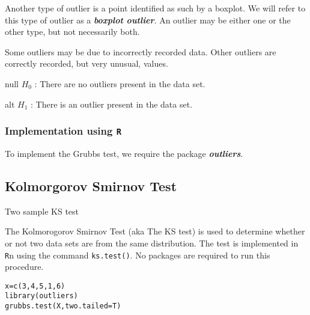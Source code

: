 Another type of outlier is a point identified as such by a boxplot. We will refer to this type of outlier as a \textbf{\textit{boxplot outlier}}.  An outlier may be either one or the other type, but not necessarily both.

Some outliers may be due to incorrectly recorded data. Other outliers are correctly recorded, but very unusual, values.

null $H_0$ : There are no outliers present in the data set.

alt $H_1$ : There is an outlier present in the data set.

\subsubsection{Implementation using \texttt{R}}
To implement the Grubbs test, we require the package \textbf{\textit{outliers}}.

\subsection{Kolmorgorov Smirnov Test}
Two sample KS test

The Kolmorogorov Smirnov Test (aka The KS test) is used to determine whether or not two data sets are from the same distribution.
The test is implemented in \texttt{R}n using the command \texttt{ks.test()}. No packages are required to run this procedure.




\begin{framed}
\begin{verbatim}
x=c(3,4,5,1,6)
library(outliers)
grubbs.test(X,two.tailed=T)
\end{verbatim}
\end{framed}





